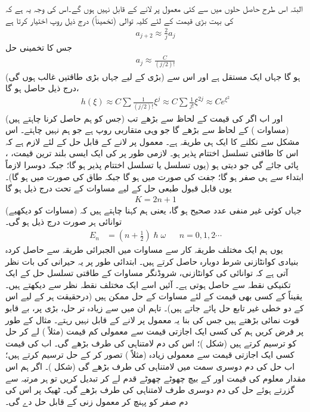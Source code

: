  البتہ اس طرح حاصل حلوں میں سے کئی معمول پر لانے کے قابل نہیں ہوں گے۔اس کی وجہ یہ ہے کہ  کی بہت بڑی قیمت کے لئے کلیہ توالی (تخمیناً) درج ذیل روپ اختیار کرتا ہے
\begin{align*}
a_{j+2}\approx\frac{2}{j}a_{j}
\end{align*}
جس کا تخمینی حل
\begin{align*}
a_{j}\approx\frac{C}{(j/2)!}
\end{align*}
ہو گا جہاں   ایک مستقل ہے اور اس سے (بڑی   کے لیے جہاں بڑی طاقتیں  غالب ہوں گی) درج ذیل حاصل ہو گا،
\begin{align*}
h(\xi)\approx C\sum\frac{1}{(j/2)!}\xi^{j}\approx C\sum\frac{1}{j!}\xi^{2j}\approx Ce^{\xi^{2}}
\end{align*}
اور اب اگر   کی  قیمت  کے لحاظ سے بڑھے تب  (جس کو ہم حاصل کرنا چاہتے ہیں) 
  (مساوات ) کے لحاظ سے بڑھے گا جو وہی متقاربی روپ ہے جو ہم نہیں چاہتے۔ اس مشکل سے نکلنے  کا ایک ہی طریقہ ہے۔ معمول پر لانے کے قابل حل کے لئے لازم ہے کہ اس کا طاقتی تسلسل اختتام پذیر ہو۔ لازمی طور پر   کی ایک ایسی بلند ترین قیمت، ،  پائی جائے گی جو  دیتی ہو (یوں   تسلسل یا   تسلسل اختتام پذیر  ہو گا؛ جبکہ  دوسرا لازماً ابتداء سے ہی صفر ہو گا؛ جفت  کی صورت میں  ہو گا جبکہ   طاق  کی صورت میں  ہو گا)۔  یوں قابل قبول طبعی حل کے لیے مساوات  کے تحت درج ذیل ہو گا
\begin{align*}
K=2n+1
\end{align*}
 جہاں  کوئی غیر منفی عدد صحیح ہو گا، یعنی ہم کہنا چاہتے ہیں کہ (مساوات  کو دیکھیے)  توانائی ہر صورت درج ذیل ہو گی۔
\begin{align}
E_{n}&=(n+\tfrac{1}{2} )\hslash\omega && n=0,1,2\cdots
\end{align}
یوں ہم  ایک  مختلف طریقہ کار سے مساوات  میں الجبرائی طریقہ سے حاصل کردہ بنیادی کوانٹازنی شرط دوبارہ حاصل کرتے ہیں۔ ابتدائی طور پر یہ حیرانی کی بات نظر آتی ہے کہ توانائی کی کوانٹازنی، شروڈنگر مساوات کے طاقتی تسلسل حل  کے ایک تکنیکی نقطہ سے حاصل ہوتی ہے۔ آئیں اسے ایک مختلف نقطہ نظر سے دیکھتے ہیں۔ یقیناً   کے کسی بھی قیمت کے لئے  مساوات  کے حل ممکن ہیں (درحقیقت ہر  کے لیے اس کے دو خطی  غیر تابع حل پائے جاتے ہیں)۔ تاہم ان میں سے زیادہ تر حل،  بڑی  پر، بے قابو قوت نمائی بڑھتے ہیں جس کی بنا یہ معمول پر لانے کے قابل نہیں رہتے۔ مثال کے طور پر فرض کریں ہم  کی کسی ایک اجازتی قیمت  سے معمولی کم   قیمت (مثلاً ) لے کر حل کو ترسیم کرتے ہیں (شکل )؛ اس کی دم لامتناہی کی طرف بڑھے گی۔ اب  کی قیمت کسی ایک اجازتی قیمت سے معمولی زیادہ  (مثلاً
)  تصور کر کے حل ترسیم کرتے ہیں؛ اب حل کی دم دوسری سمت میں لامتناہی کی طرف بڑھے گی (شکل )۔  اگر  ہم اس مقدار معلوم کی قیمت  اور  کے بیچ چھوٹے  چھوٹے قدم لے کر تبدیل کریں تو ہر مرتبہ  سے گزرتے ہوئے  حل کی دم دوسری  طرف لامتناہی کی طرف بڑھے گی۔ ٹھیک  پر اس کی دم صفر  کو پہنچ کر معمول زنی کے قابل حل دے گی۔

